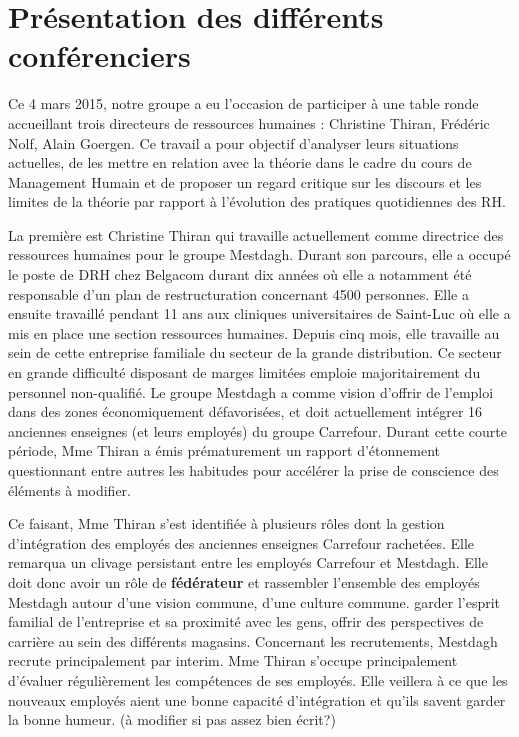 \documentclass[a4paper, 12pt]{article}
\begin{document}


\section{Présentation des différents conférenciers}
Ce 4 mars 2015, notre groupe a eu l'occasion de participer à une table ronde accueillant trois directeurs de ressources humaines : Christine Thiran, Frédéric Nolf, Alain Goergen. Ce travail a pour objectif d'analyser leurs situations actuelles, de les mettre en relation avec la théorie dans le cadre du cours de Management Humain et de proposer un regard critique sur les discours et les limites de la théorie par rapport à l'évolution des pratiques quotidiennes des RH. \newline

La première est Christine Thiran qui travaille actuellement comme directrice des ressources humaines pour le groupe Mestdagh. Durant son parcours, elle a occupé le poste de DRH chez Belgacom durant dix années  où elle a notamment été responsable d'un plan de restructuration concernant 4500 personnes.
Elle a ensuite travaillé pendant 11 ans aux cliniques universitaires de Saint-Luc où elle a mis en place une section ressources humaines.
Depuis cinq mois, elle travaille au sein de cette entreprise familiale du secteur de la grande distribution. Ce secteur en grande difficulté disposant de marges limitées emploie majoritairement du personnel non-qualifié. Le groupe Mestdagh a comme vision d'offrir de l'emploi dans des zones économiquement défavorisées, et doit actuellement intégrer 16 anciennes enseignes (et leurs employés) du groupe Carrefour.
Durant cette courte période, Mme Thiran a émis prématurement un rapport d'étonnement questionnant entre autres les habitudes pour accélérer la prise de conscience des éléments à modifier. \newline

Ce faisant, Mme Thiran s'est identifiée à plusieurs rôles dont la gestion d'intégration des employés des anciennes enseignes Carrefour rachetées. Elle remarqua un clivage persistant entre les employés Carrefour et Mestdagh. Elle doit donc avoir un rôle de \textbf{fédérateur} et rassembler l'ensemble des employés Mestdagh autour d'une vision commune, d'une culture commune.  garder l'esprit familial de l'entreprise et sa proximité avec les gens, offrir des perspectives de carrière au sein des différents magasins. Concernant les recrutements, Mestdagh recrute principalement par interim. Mme Thiran s'occupe principalement d'évaluer régulièrement les compétences de ses employés. Elle veillera à ce que les nouveaux employés aient une bonne capacité d'intégration et qu'ils savent garder la bonne humeur. (à modifier si pas assez bien écrit?)\newline
\end{document}
